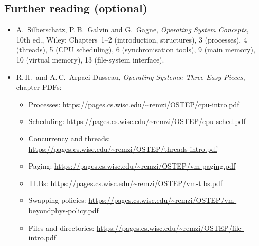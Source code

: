 \documentclass[11pt,a4paper]{article}
\begin{document}
\subsection*{Further reading (optional)}
\begin{itemize}
  \item A.\ Silberschatz, P.\,B.\ Galvin and G.\ Gagne, \emph{Operating System Concepts}, 10th ed., Wiley: Chapters~1--2 (introduction, structures), 3 (processes), 4 (threads), 5 (CPU scheduling), 6 (synchronisation tools), 9 (main memory), 10 (virtual memory), 13 (file-system interface).
  \item R.\,H.\ and A.\,C.\ Arpaci-Dusseau, \emph{Operating Systems: Three Easy Pieces}, chapter PDFs:
  \begin{itemize}[itemsep=0em]
    \item Processes: \url{https://pages.cs.wisc.edu/~remzi/OSTEP/cpu-intro.pdf}
    \item Scheduling: \url{https://pages.cs.wisc.edu/~remzi/OSTEP/cpu-sched.pdf}
    \item Concurrency and threads: \url{https://pages.cs.wisc.edu/~remzi/OSTEP/threads-intro.pdf}
    \item Paging: \url{https://pages.cs.wisc.edu/~remzi/OSTEP/vm-paging.pdf}
    \item TLBs: \url{https://pages.cs.wisc.edu/~remzi/OSTEP/vm-tlbs.pdf}
    \item Swapping policies: \url{https://pages.cs.wisc.edu/~remzi/OSTEP/vm-beyondphys-policy.pdf}
    \item Files and directories: \url{https://pages.cs.wisc.edu/~remzi/OSTEP/file-intro.pdf}
  \end{itemize}
\end{itemize}
\end{document}
